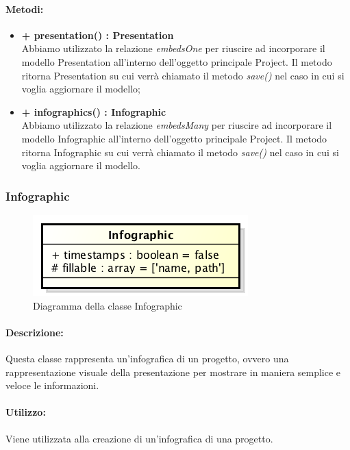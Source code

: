 	\paragraph{Metodi:}
	\begin{itemize}
		\item \textbf{+ presentation() : Presentation}\\
		Abbiamo utilizzato la relazione \textit{embedsOne} per riuscire ad incorporare il modello Presentation all'interno dell'oggetto principale Project. Il metodo ritorna Presentation su cui verrà chiamato il metodo \textit{save()} nel caso in cui si voglia aggiornare il modello;
		\item \textbf{+ infographics() : Infographic}\\
		Abbiamo utilizzato la relazione \textit{embedsMany} per riuscire ad incorporare il modello Infographic all'interno dell'oggetto principale Project. Il metodo ritorna Infographic su cui verrà chiamato il metodo \textit{save()} nel caso in cui si voglia aggiornare il modello.
	\end{itemize}

\newpage
\subsubsection{Infographic}

	\begin{figure}[h]
		\centering
		\includegraphics[width=0.5\linewidth]{img/back_end_premi_model_infographic}
		\caption[Diagramma della classe Infographic]{Diagramma della classe Infographic}
		\label{fig:back_end_premi_model_infographic}
	\end{figure}


	\paragraph{Descrizione:}
	Questa classe rappresenta un'infografica di un progetto, ovvero una rappresentazione visuale della presentazione per mostrare in maniera semplice e veloce le informazioni.
	
	\paragraph{Utilizzo:}
	Viene utilizzata alla creazione di un'infografica di una progetto.

